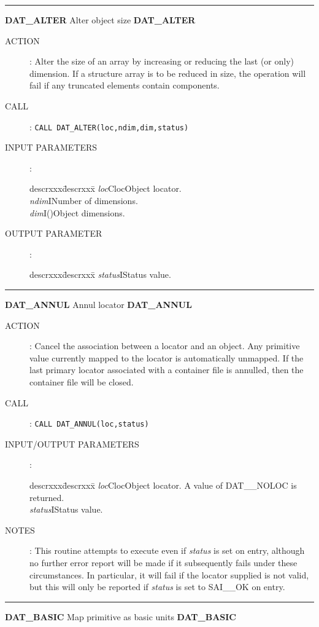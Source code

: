 \goodbreak
\rule{\textwidth}{0.3mm}
{\Large {\bf DAT\_ALTER} \hfill Alter object size \hfill {\bf DAT\_ALTER}}
\begin{description}
\item [ACTION]:
Alter the size of an array by increasing or reducing the last (or only)
dimension.
If a structure array is to be reduced in size, the operation will fail if any
truncated elements contain components.
\item [CALL]:
{\tt CALL DAT\_ALTER(loc,ndim,dim,status)}
\item [INPUT PARAMETERS]:
\begin{tabbing}
descrxxx\=descrxxx\=\kill
{\em loc}\>Cloc\>Object locator.\\
{\em ndim}\>I\>Number of dimensions.\\
{\em dim}\>I()\>Object dimensions.
\end{tabbing}
\item [OUTPUT PARAMETER]:
\begin{tabbing}
descrxxx\=descrxxx\=\kill
{\em status}\>I\>Status value.
\end{tabbing}
\end{description}
\goodbreak
\rule{\textwidth}{0.3mm}
{\Large {\bf DAT\_ANNUL} \hfill Annul locator \hfill {\bf DAT\_ANNUL}}
\begin{description}
\item [ACTION]:
Cancel the association between a locator and an object. Any primitive value
currently mapped to the locator is automatically unmapped. If the last primary
locator associated with a container file is annulled, then the container file
will be closed.
\item [CALL]:
{\tt CALL DAT\_ANNUL(loc,status)}
\item [INPUT/OUTPUT PARAMETERS]:
\begin{tabbing}
descrxxx\=descrxxx\=\kill
{\em loc}\>Cloc\>Object locator. A value of DAT\_\_NOLOC is returned.\\
{\em status}\>I\>Status value.
\end{tabbing}
\item [NOTES]:
This routine attempts to execute even if {\em status} is set on entry, although
no further error report will be made if it subsequently fails under these
circumstances. In particular, it will fail if the locator supplied is not
valid, but this will only be reported if {\em status} is set to SAI\_\_OK on
entry.
\end{description}
\goodbreak
\rule{\textwidth}{0.3mm}
{\Large {\bf DAT\_BASIC} \hfill Map primitive as basic units \hfill {\bf DAT\_BASIC}}
